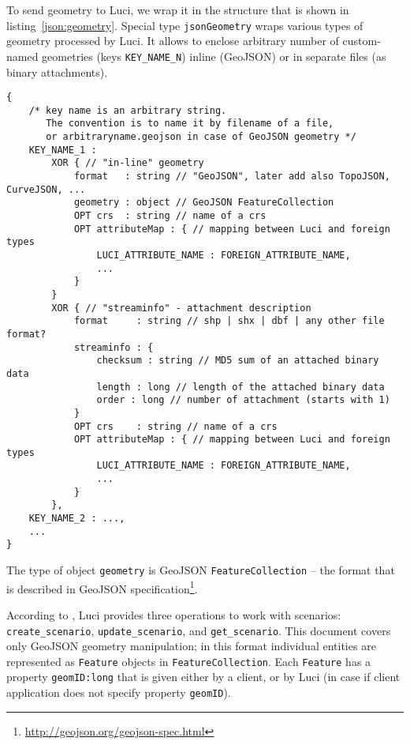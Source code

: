 To send geometry to \ac{Luci}, we wrap it in the structure that is shown in listing~\ref{json:geometry}.
Special type \texttt{\color{blue}jsonGeometry} wraps various types of geometry processed by \ac{Luci}.
It allows to enclose arbitrary number of custom-named geometries (keys \texttt{KEY\_NAME\_N}) inline (GeoJSON) or in separate files (as binary attachments).
%
\begin{lstlisting}[caption={structure of \texttt{\color{blue}jsonGeometry} data type}, label={json:geometry}]
{
	/* key name is an arbitrary string.
	   The convention is to name it by filename of a file,
	   or arbitraryname.geojson in case of GeoJSON geometry */
	KEY_NAME_1 :
		XOR { // "in-line" geometry
			format   : string // "GeoJSON", later add also TopoJSON, CurveJSON, ...
			geometry : object // GeoJSON FeatureCollection
			OPT crs  : string // name of a crs
			OPT attributeMap : { // mapping between Luci and foreign types
				LUCI_ATTRIBUTE_NAME : FOREIGN_ATTRIBUTE_NAME,
				...
			}
		}
		XOR { // "streaminfo" - attachment description
			format     : string // shp | shx | dbf | any other file format?
			streaminfo : {
				checksum : string // MD5 sum of an attached binary data
				length : long // length of the attached binary data
				order : long // number of attachment (starts with 1)
			}
			OPT crs    : string // name of a crs
			OPT attributeMap : { // mapping between Luci and foreign types
				LUCI_ATTRIBUTE_NAME : FOREIGN_ATTRIBUTE_NAME,
				...
			}
		},
	KEY_NAME_2 : ...,
	...
}
\end{lstlisting}
%
The type of object \texttt{geometry} is GeoJSON \texttt{FeatureCollection} -- the format that is described in GeoJSON specification\footnote{\url{http://geojson.org/geojson-spec.html}}.



According to ,
\ac{Luci} provides three operations to work with scenarios:
\texttt{create\_scenario}, \texttt{update\_scenario}, and \texttt{get\_scenario}.
This document covers only GeoJSON geometry manipulation;
in this format individual entities are represented as \texttt{Feature} objects in \texttt{FeatureCollection}.
Each \texttt{Feature} has a property \texttt{geomID:\color{blue}long} that is given either by a client, or by \ac{Luci} (in case if client application does not specify property \texttt{geomID}).


